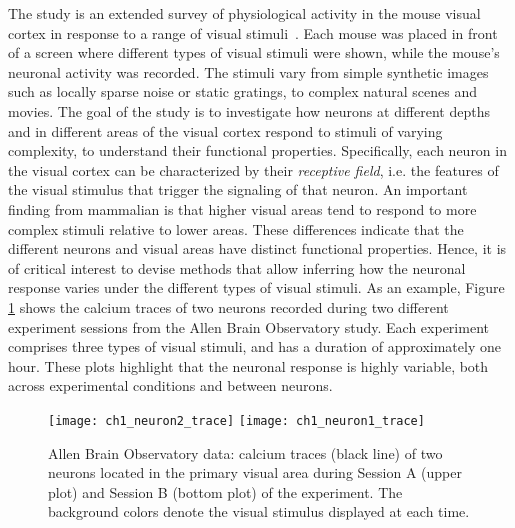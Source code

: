 The study is an extended survey of physiological activity in the mouse visual cortex in response to a range of visual stimuli~\citep{allen_stimulus}. Each mouse was placed in front of a screen where different types of visual stimuli were shown, while the mouse’s neuronal activity was recorded. The stimuli vary from simple synthetic images such as locally sparse noise or static gratings, to complex natural scenes and movies.
The goal of the study is to investigate how neurons at different depths and in different areas of the visual cortex respond to stimuli of varying complexity, to understand their functional properties. Specifically, each neuron in the visual cortex can be characterized by their \textit{receptive field}, i.e. the features of the visual stimulus that trigger the signaling of that neuron. 
An important finding from mammalian is that higher visual areas tend to respond to more complex stimuli relative to lower areas. These differences indicate that the different neurons and visual areas have distinct functional properties.
Hence, it is of critical interest to devise methods that allow inferring how the neuronal response varies under the different types of visual stimuli. %
As an example, Figure \ref{ch1_fig:trace_neurons} shows the calcium traces of two neurons recorded during two different experiment sessions from the Allen Brain Observatory study.
Each experiment comprises three types of visual stimuli, and has a duration of approximately one hour.
These plots highlight that the neuronal response is highly variable, both across experimental conditions and between neurons.

\begin{figure}
	\centering
	\texttt{[image: ch1\_neuron2\_trace]}
	\centering
	\texttt{[image: ch1\_neuron1\_trace]}
	\caption[Allen Brain Observatory data: calcium traces of two neurons located in the primary visual area during Session A and Session B of the experiment. ]{Allen Brain Observatory data: calcium traces (black line) of two neurons located in the primary visual area during Session A (upper plot) and Session B (bottom plot) of the experiment. The background colors denote the visual stimulus displayed at each time.}\label{ch1_fig:trace_neurons}
\end{figure}

